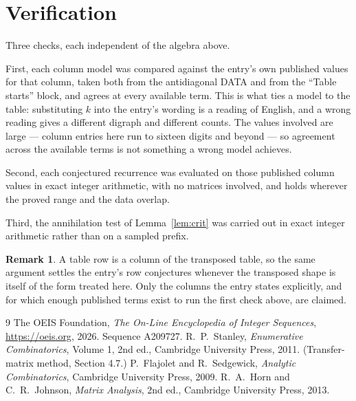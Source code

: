 \documentclass[11pt,a4paper]{article}
\theoremstyle{plain}
\theoremstyle{definition}
\newtheorem{remark}[theorem]{Remark}
\begin{document}
\section{Verification}

Three checks, each independent of the algebra above.

First, each column model was compared against the entry's own published values for that
column, taken both from the antidiagonal DATA and from the ``Table starts'' block, and agrees
at every available term. This is what ties a model to the table: substituting $k$ into the
entry's wording is a reading of English, and a wrong reading gives a different digraph and
different counts. The values involved are large --- column entries here run to sixteen digits
and beyond --- so agreement across the available terms is not something a wrong model
achieves.

Second, each conjectured recurrence was evaluated on those published column values in exact
integer arithmetic, with no matrices involved, and holds wherever the proved range and the
data overlap.

Third, the annihilation test of Lemma~\ref{lem:crit} was carried out in exact integer
arithmetic rather than on a sampled prefix.

\begin{remark}
A table row is a column of the transposed table, so the same argument settles the entry's row
conjectures whenever the transposed shape is itself of the form treated here. Only the columns
the entry states explicitly, and for which enough published terms exist to run the first check
above, are claimed.
\end{remark}

\begin{thebibliography}{9}
 The OEIS Foundation, \emph{The On-Line Encyclopedia of Integer
Sequences}, \url{https://oeis.org}, 2026. Sequence A209727.
 R.~P.~Stanley, \emph{Enumerative Combinatorics}, Volume 1, 2nd ed.,
Cambridge University Press, 2011. (Transfer-matrix method, Section 4.7.)
 P.~Flajolet and R.~Sedgewick, \emph{Analytic Combinatorics}, Cambridge
University Press, 2009.
 R.~A.~Horn and C.~R.~Johnson, \emph{Matrix Analysis}, 2nd ed., Cambridge
University Press, 2013.
\end{thebibliography}
\end{document}
